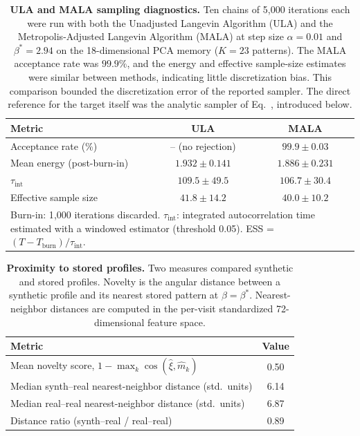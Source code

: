 \begin{table}[ht]
\centering
\caption{\textbf{ULA and MALA sampling diagnostics.} Ten chains of 5{,}000
iterations each were run with both the Unadjusted Langevin Algorithm (ULA)
and the Metropolis-Adjusted Langevin Algorithm (MALA) at step size
$\alpha = 0.01$ and $\beta^* = 2.94$ on the 18-dimensional PCA memory
($K{=}23$ patterns). The MALA acceptance rate was $99.9\%$, and the energy and effective
sample-size estimates were similar between methods, indicating little discretization bias.
This comparison bounded the
discretization error of the reported sampler. The direct reference for the
target itself was the analytic sampler of Eq.~,
introduced below.}
\label{tab:ula-vs-mala}
\begin{tabular}{lcc}
\toprule
Metric & ULA & MALA \\
\midrule
Acceptance rate (\%)         & -- (no rejection) & $99.9 \pm 0.03$ \\
Mean energy (post-burn-in)   & $1.932 \pm 0.141$ & $1.886 \pm 0.231$ \\
$\tau_{\text{int}}$          & $109.5 \pm 49.5$  & $106.7 \pm 30.4$ \\
Effective sample size        & $41.8 \pm 14.2$   & $40.0 \pm 10.2$ \\
\bottomrule
\multicolumn{3}{p{0.85\textwidth}}{\small Burn-in: 1{,}000 iterations discarded. $\tau_{\text{int}}$: integrated
autocorrelation time estimated with a windowed estimator (threshold 0.05).
ESS = $(T - T_{\text{burn}}) / \tau_{\text{int}}$.}
\end{tabular}
\end{table}

\begin{table}[ht]
\centering
\caption{\textbf{Proximity to stored profiles.} Two measures compared synthetic and stored
profiles. Novelty is the angular distance between a synthetic profile and its
nearest stored pattern at $\beta = \beta^*$. Nearest-neighbor distances are
computed in the per-visit standardized 72-dimensional feature space.}
\label{stab:memorization}
\begin{tabular}{lc}
\toprule
Metric & Value \\
\midrule
Mean novelty score, $1 - \max_k \cos(\hat{\xi}, \hat{m}_k)$ & 0.50 \\
Median synth--real nearest-neighbor distance (std.\ units) & 6.14 \\
Median real--real nearest-neighbor distance (std.\ units)  & 6.87 \\
Distance ratio (synth--real / real--real)                  & 0.89 \\
\bottomrule
\end{tabular}
\end{table}

